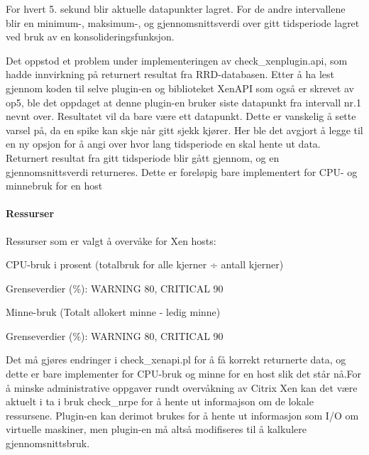 For hvert 5. sekund blir aktuelle datapunkter lagret. For de andre intervallene blir en minimum-, maksimum-, og gjennomsnittsverdi over gitt tidsperiode lagret ved bruk av en konsolideringsfunksjon. \cite{xenrrd}

Det oppstod et problem under implementeringen av check\_xenplugin.api, som hadde innvirkning på returnert resultat fra RRD-databasen. Etter å ha lest gjennom koden til selve plugin-en og biblioteket XenAPI som også er skrevet av op5, ble det oppdaget at denne plugin-en bruker siste datapunkt fra intervall nr.1 nevnt over. Resultatet vil da bare være ett datapunkt. Dette er vanskelig å sette varsel på, da en spike kan skje når gitt sjekk kjører. Her ble det avgjort å legge til en ny opsjon for å angi over hvor lang tidsperiode en skal hente ut data. Returnert resultat fra gitt tidsperiode blir gått gjennom, og en gjennomsnittsverdi returneres. Dette er foreløpig bare implementert for CPU- og minnebruk for en host

\paragraph{Ressurser}
Ressurser som er valgt å overvåke for Xen hosts:
\begin{itemize*}
        \item CPU-bruk i prosent (totalbruk for alle kjerner ÷ antall kjerner)
        \begin{itemize*}
                \item Grenseverdier (\%): WARNING 80, CRITICAL 90
        \end{itemize*}
        \item Minne-bruk (Totalt allokert minne - ledig minne)
        \begin{itemize*}
                \item Grenseverdier (\%): WARNING 80, CRITICAL 90
        \end{itemize*}
\end{itemize*}

Det må gjøres endringer i check\_xenapi.pl for å få korrekt returnerte data, og dette er bare implementer for CPU-bruk og minne for en host slik det står nå.For å minske administrative oppgaver rundt overvåkning av Citrix Xen kan det være aktuelt i ta i bruk check\_nrpe for å hente ut informajson om de lokale ressursene. Plugin-en kan derimot brukes for å hente ut informasjon som I/O om virtuelle maskiner, men plugin-en må altså modifiseres til å kalkulere gjennomsnittsbruk.

